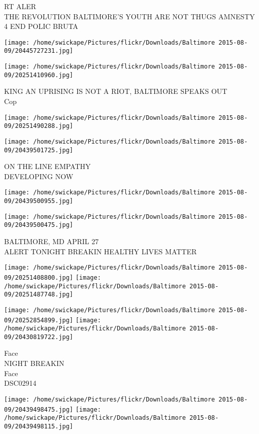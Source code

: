 \documentclass[10pt,letterpaper]{article}
\begin{document}
RT ALER\\
THE REVOLUTION BALTIMORE'S YOUTH ARE NOT THUGS AMNESTY 4 END POLIC BRUTA
\pagebreak

\texttt{[image: /home/swickape/Pictures/flickr/Downloads/Baltimore 2015-08-09/20445727231.jpg]}

\vspace{0.25in}
\texttt{[image: /home/swickape/Pictures/flickr/Downloads/Baltimore 2015-08-09/20251410960.jpg]}

KING AN UPRISING IS NOT A RIOT, BALTIMORE SPEAKS OUT\\
Cop
\pagebreak

\texttt{[image: /home/swickape/Pictures/flickr/Downloads/Baltimore 2015-08-09/20251490288.jpg]}

\vspace{0.25in}
\texttt{[image: /home/swickape/Pictures/flickr/Downloads/Baltimore 2015-08-09/20439501725.jpg]}

ON THE LINE EMPATHY\\
DEVELOPING NOW
\pagebreak

\texttt{[image: /home/swickape/Pictures/flickr/Downloads/Baltimore 2015-08-09/20439500955.jpg]}

\vspace{0.25in}
\texttt{[image: /home/swickape/Pictures/flickr/Downloads/Baltimore 2015-08-09/20439500475.jpg]}

BALTIMORE, MD APRIL 27\\
ALERT TONIGHT BREAKIN HEALTHY LIVES MATTER
\pagebreak

\texttt{[image: /home/swickape/Pictures/flickr/Downloads/Baltimore 2015-08-09/20251408800.jpg]}
\texttt{[image: /home/swickape/Pictures/flickr/Downloads/Baltimore 2015-08-09/20251487748.jpg]}

\texttt{[image: /home/swickape/Pictures/flickr/Downloads/Baltimore 2015-08-09/20252854899.jpg]}
\texttt{[image: /home/swickape/Pictures/flickr/Downloads/Baltimore 2015-08-09/20430819722.jpg]}

Face\\
NIGHT BREAKIN\\
Face\\
DSC02914
\pagebreak

\texttt{[image: /home/swickape/Pictures/flickr/Downloads/Baltimore 2015-08-09/20439498475.jpg]}
\texttt{[image: /home/swickape/Pictures/flickr/Downloads/Baltimore 2015-08-09/20439498115.jpg]}
\end{document}
